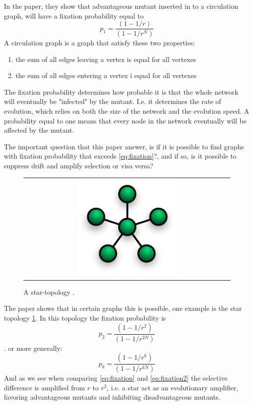 In the \cite{lieberman2005evolutionary} paper, they show that advantageous mutant inserted in to a
 circulation graph, will have a fixation probability equal to
\begin{equation}  p_{1}=\frac{(1-1/r)}{(1-1/r^{N})} \label{eq:fixation} \end{equation}
A circulation graph is a graph that satisfy these two properties:
\begin{enumerate}
\item the sum of all edges leaving a vertex is equal for all vertexes
\item the sum of all edges entering a vertex i equal for all vertexes
\end{enumerate}
The fixation probability determines how probable it is that the whole network will eventually be
"infected" by the mutant. I.e. it determines the rate of evolution, which relies on both the size of the
network and the evolution speed. 
A probability equal to one means that every node in the network eventually will be affected by the mutant.

The important question that this paper answer, is if it is possible to find graphs with fixation probability that exceeds \ref{eq:fixation}?, and if so, is it possible to suppress drift and amplify selection or visa versa?
\begin{figure}[b]
\centering
\begin{tabular}{@{}c@{}}
\includegraphics[width=0.5\textwidth]{NetworkTopology-Star.png}
\end{tabular}
\caption{
\label{fig:star} A star-topology 
\cite{lieberman2005evolutionary} . 
}
\end{figure}

The paper shows that in certain graphs this is possible, one example is the star topology \ref{fig:star}.
In this topology the fixation probability is\begin{equation}p_{2}=\frac{(1-1/r^{2})}{(1-1/r^{2N})} \label{eq:fixation2} \end{equation}.
or more generally: \begin{equation}
p_{k}=\frac{(1-1/r^{k})}{(1-1/r^{kN})} \label{eq:fixationk}
\end{equation}
And as we see when comparing \ref{eq:fixation} and \ref{eq:fixation2} the selective difference is
 amplified from $r$ to $r^{2}$, i.e. a star act as an evolutionary amplifier, favoring advantageous
  mutants and inhibiting disadvantageous mutants.
  
